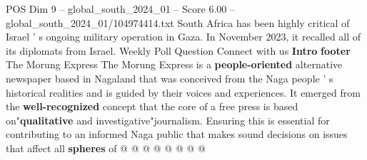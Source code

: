 \begin{textsample}{POS Dim 9 – global\_south\_2024\_01 – Score 6.00 – global\_south\_2024\_01/104974414.txt}
South Africa has been highly critical of Israel ' s ongoing military operation in Gaza.
In November 2023, it recalled all of its diplomats from Israel.
Weekly Poll Question Connect with us \textbf{Intro} \textbf{footer} The Morung Express The Morung Express is a \textbf{people-oriented} alternative newspaper based in Nagaland that was conceived from the Naga people ' s historical realities and is guided by their voices and experiences.
It emerged from the \textbf{well-recognized} concept that the core of a free press is based on"\textbf{qualitative} and investigative"journalism.
Ensuring this is essential for contributing to an informed Naga public that makes sound decisions on issues that affect all \textbf{spheres} of @ @ @ @ @ @ @ @

\end{textsample}
